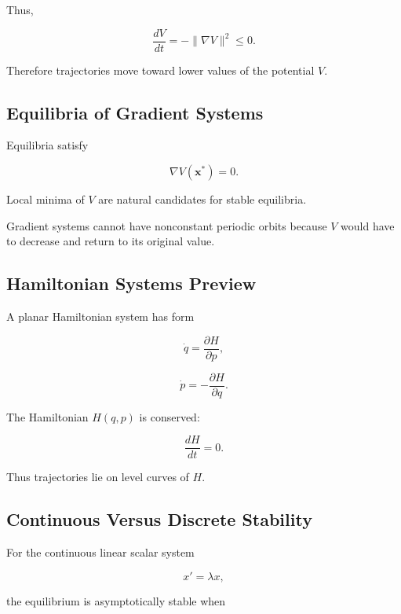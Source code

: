 Thus,

\[
\boxed{
\frac{dV}{dt}
=
-
\|
\nabla V
\|^2
\leq
0.
}
\]

Therefore trajectories move toward lower values of the potential \(V\).

\subsection{Equilibria of Gradient Systems}
\label{subsec:gradient-system-equilibria}

Equilibria satisfy

\[
\boxed{
\nabla V(\mathbf{x}^*)=0.
}
\]

Local minima of \(V\) are natural candidates for stable equilibria.

Gradient systems cannot have nonconstant periodic orbits because \(V\)
would have to decrease and return to its original value.

\subsection{Hamiltonian Systems Preview}
\label{subsec:hamiltonian-systems-dynamics}

A planar Hamiltonian system has form

\[
\boxed{
\dot q
=
\frac{\partial H}{\partial p},
}
\]

\[
\boxed{
\dot p
=
-
\frac{\partial H}{\partial q}.
}
\]

The Hamiltonian \(H(q,p)\) is conserved:

\[
\boxed{
\frac{dH}{dt}=0.
}
\]

Thus trajectories lie on level curves of \(H\).

\subsection{Continuous Versus Discrete Stability}
\label{subsec:continuous-discrete-stability}

For the continuous linear scalar system

\[
x'=\lambda x,
\]

the equilibrium is asymptotically stable when

